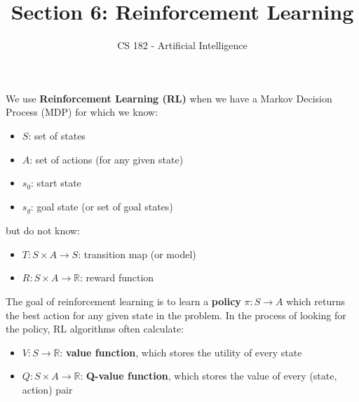 \documentclass[a4paper]{article}
\title{Section 6: Reinforcement Learning}
\author{CS 182 - Artificial Intelligence}
\date{}
\begin{document}
\maketitle

\noindent We use \textbf{Reinforcement Learning (RL)} when we have a Markov Decision Process (MDP) for which we know: 
\begin{itemize}
    \item $S$: set of states
    \item $A$: set of actions (for any given state)
    \item $s_0$: start state
    \item $s_g$: goal state (or set of goal states)
\end{itemize}
but do not know:
\begin{itemize}
    \item $T : S \times A \to S$: transition map (or model)
    \item $R : S \times A \to \mathbb{R}$: reward function
\end{itemize}
The goal of reinforcement learning is to learn a \textbf{policy} $\pi: S \to A$ which returns the best action for any given state in the problem. In the process of looking for the policy, RL algorithms often calculate:
\begin{itemize}
    \item $V : S \to \mathbb{R}$: \textbf{value function}, which stores the utility of every state
    \item $Q : S \times A \to \mathbb{R}$: \textbf{Q-value function}, which stores the value of every (state, action) pair \\
\end{itemize}
\end{document}
